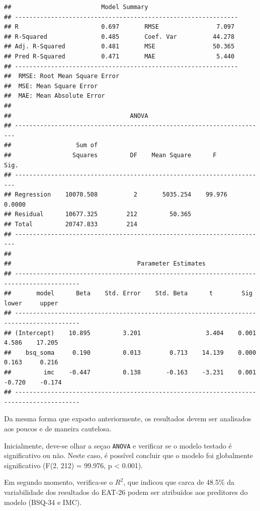 \documentclass[
]{book}
\begin{document}
\begin{verbatim}
##                         Model Summary                          
## --------------------------------------------------------------
## R                       0.697       RMSE                7.097 
## R-Squared               0.485       Coef. Var          44.278 
## Adj. R-Squared          0.481       MSE                50.365 
## Pred R-Squared          0.471       MAE                 5.440 
## --------------------------------------------------------------
##  RMSE: Root Mean Square Error 
##  MSE: Mean Square Error 
##  MAE: Mean Absolute Error 
## 
##                                 ANOVA                                  
## ----------------------------------------------------------------------
##                  Sum of                                               
##                 Squares         DF    Mean Square      F         Sig. 
## ----------------------------------------------------------------------
## Regression    10070.508          2       5035.254    99.976    0.0000 
## Residual      10677.325        212         50.365                     
## Total         20747.833        214                                    
## ----------------------------------------------------------------------
## 
##                                   Parameter Estimates                                    
## ----------------------------------------------------------------------------------------
##       model      Beta    Std. Error    Std. Beta      t        Sig      lower     upper 
## ----------------------------------------------------------------------------------------
## (Intercept)    10.895         3.201                  3.404    0.001     4.586    17.205 
##    bsq_soma     0.190         0.013        0.713    14.139    0.000     0.163     0.216 
##         imc    -0.447         0.138       -0.163    -3.231    0.001    -0.720    -0.174 
## ----------------------------------------------------------------------------------------
\end{verbatim}

Da mesma forma que exposto anteriormente, os resultados devem ser analisados aos poucos e de maneira cautelosa.

Inicialmente, deve-se olhar a seçao \texttt{ANOVA} e verificar se o modelo testado é significativo ou não. Neste caso, é possível concluir que o modelo foi globalmente significativo (F(2, 212) = 99.976, p \textless{} 0.001).

Em segundo momento, verifica-se o \(R^2\), que indicou que carca de 48.5\% da variabilidade dos resultados do EAT-26 podem ser atribuídos aos preditores do modelo (BSQ-34 e IMC).
\end{document}
